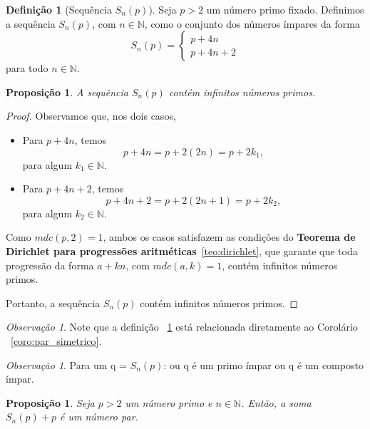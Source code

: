 \documentclass[a4paper,11pt]{article}
\newtheorem{proposition}[theorem]{Proposição}
\theoremstyle{definition}
\newtheorem{definition}[theorem]{Definição}
\theoremstyle{remark}
\newtheorem{remark}[theorem]{Observação}
\begin{document}
\begin{otherlanguage}{brazil}
	
	\begin{definition}[Sequência \(S_n(p)\)]\label{def:snp}
		Seja \(p > 2\) um número primo fixado. Definimos a sequência \(S_n(p)\), com \(n \in \mathbb{N}\), como o conjunto dos números ímpares da forma
		\[
		S_n(p) = 
		\begin{cases}
			p + 4n \\
			p + 4n + 2
		\end{cases}
		\]
		para todo \(n \in \mathbb{N}\).
	\end{definition}
	
	\vspace{0.5cm}
	
	\begin{proposition}
		A sequência \(S_n(p)\) contém infinitos números primos.
	\end{proposition}
	
	\begin{proof}
		Observamos que, nos dois casos,
		\begin{itemize}
			\item Para \(p + 4n\), temos
			\[
			p + 4n = p + 2(2n) = p + 2k_1,
			\]
			para algum \(k_1 \in \mathbb{N}\).
			
			\item Para \(p + 4n + 2\), temos
			\[
			p + 4n + 2 = p + 2(2n + 1) = p + 2k_2,
			\]
			para algum \(k_2 \in \mathbb{N}\).
		\end{itemize}
		
		Como \(mdc(p, 2) = 1\), ambos os casos satisfazem as condições do  \textbf{Teorema de Dirichlet para progressões aritméticas}~\ref{teo:dirichlet}, que garante que toda progressão da forma \(a + kn\), com \(mdc(a, k) = 1\), contém infinitos números primos.
		
		Portanto, a sequência \(S_n(p)\) contém infinitos números primos.
	\end{proof}
	
	\begin{remark}
		Note que a definição ~\ref{def:snp} está relacionada diretamente ao Corolário ~\ref{coro:par_simetrico}.
	\end{remark}
	
	\begin{remark}
		Para um q = \(S_n(p)\): ou q é um primo ímpar ou q é um composto ímpar.
	\end{remark}
	
	\begin{proposition}
		Seja \( p > 2 \) um número primo e \( n \in \mathbb{N} \). Então, a soma \( S_n(p) + p \) é um número par.
	\end{proposition}
	

\end{otherlanguage}
\end{document}
